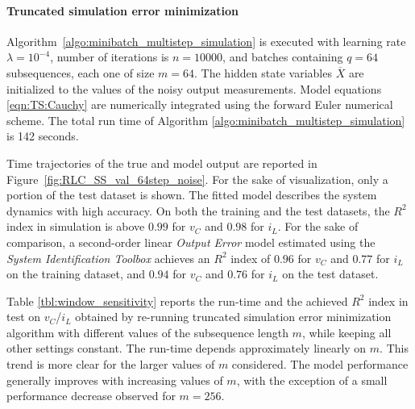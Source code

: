 \documentclass{article} %
\newcommand{\batchsize}{q}
\newcommand{\seqlen}{m}
\newcommand{\numiter}{n}
\newcommand{\hidden}[1]{\overline{#1}}
\begin{document}
\paragraph{Truncated simulation error minimization}
Algorithm~\ref{algo:minibatch_multistep_simulation} is executed with learning rate $\lambda=10^{-4}$, number of iterations is $\numiter=10000$, and 
batches containing $\batchsize=64$ subsequences, each one of size $\seqlen=64$. 
The hidden state variables $\hidden{X}$ are initialized to the values of the noisy output measurements. 
Model equations \eqref{eqn:TS:Cauchy} are numerically integrated using the forward Euler numerical scheme. 
The total run time of Algorithm \ref{algo:minibatch_multistep_simulation} is 142 seconds. 

Time trajectories of the true and model output are reported in Figure~\ref{fig:RLC_SS_val_64step_noise}. For the sake of visualization, only a portion of the test dataset is shown.   
The fitted model describes the system dynamics with high accuracy. On both the training and the test datasets, the $R^2$ index in simulation is above $0.99$ for $v_C$ and $0.98$ for $i_L$. For the sake of comparison, a second-order linear \emph{Output Error} model estimated using the \emph{System Identification Toolbox}  \citep{ljung2012version} achieves an $R^2$ index of $0.96$ for $v_C$ and $0.77$ for $i_L$ on the training dataset, and $0.94$ for $v_C$ and $0.76$ for $i_L$ on the test dataset. 

{
Table \ref{tbl:window_sensitivity} reports the run-time and the achieved $R^2$ index in test on $v_C$/$i_L$ obtained by re-running truncated simulation error minimization algorithm with different values of the subsequence length $m$, while keeping all other settings constant. The run-time depends approximately linearly on $m$. This trend is more clear for the larger values of $m$ considered. The model performance generally improves with increasing values of $m$, with the exception of a small performance decrease observed for $m=256$.
}
\end{document}
